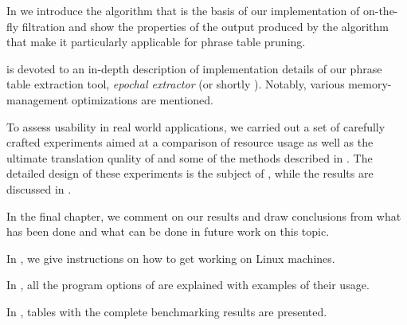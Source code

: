 In  we introduce the algorithm that is the basis of our implementation
of on-the-fly filtration and show the properties of the output produced
by the algorithm that make it particularly applicable for phrase table pruning.

 is devoted to an in-depth description of implementation details of our
phrase table extraction tool, \emph{epochal extractor} (or shortly \eppex{}).
Notably, various memory-management optimizations are mentioned.

To assess \eppex{} usability in real world applications, we carried out a set
of carefully crafted experiments aimed at a comparison of resource usage as well as
the ultimate translation quality of \eppex{} and some of the methods described
in .
The detailed design of these experiments is the subject of ,
while the results are discussed in .

In the final chapter, we comment on our results and draw conclusions from
what has been done and what can be done in future work on this topic.

In , we give instructions on how to get \eppex{} working on Linux machines.

In , all the program options of \eppex{} are explained with examples of their usage.

In , tables with the complete benchmarking results are presented.
